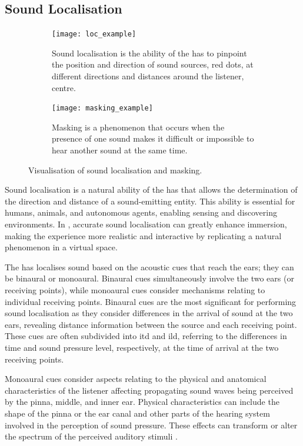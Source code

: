 \subsection{Sound Localisation}
\begin{figure}
    \centering
    \begin{subfigure}[t]{0.49\textwidth}
        \centering
        \texttt{[image: loc\_example]}
        \caption{Sound localisation is the ability of the \acrshort{has} to pinpoint the position and direction of sound sources, red dots, at different directions and distances around the listener, centre.}
        \label{fig:loc-example}
    \end{subfigure}
    \hfill
    \begin{subfigure}[t]{0.49\textwidth}
        \centering
        \texttt{[image: masking\_example]}
        \caption{Masking is a phenomenon that occurs when the presence of one sound makes it difficult or impossible to hear another sound at the same time.}
        \label{fig:masking-example}
    \end{subfigure}

       \caption[Visualisation of sound localisation and masking]{Visualisation of sound localisation and masking.}
       \label{fig:loc-masking-examples}
\end{figure}

Sound localisation is a natural ability of the \acrshort{has} that allows the determination of the direction and distance of a sound-emitting entity. This ability is essential for humans, animals, and autonomous agents, enabling sensing and discovering environments. In , accurate sound localisation can greatly enhance immersion, making the experience more realistic and interactive by replicating a natural phenomenon in a virtual space.\par
The \acrshort{has} localises sound based on the acoustic cues that reach the ears; they can be binaural or monoaural. Binaural cues simultaneously involve the two ears (or receiving points), while monoaural cues consider mechanisms relating to individual receiving points. Binaural cues are the most significant for performing sound localisation as they consider differences in the arrival of sound at the two ears, revealing distance information between the source and each receiving point. These cues are often subdivided into \acrfull{itd} and \acrfull{ild}, referring to the differences in time and sound pressure level, respectively, at the time of arrival at the two receiving points.\par
Monoaural cues consider aspects relating to the physical and anatomical characteristics of the listener affecting propagating sound waves being perceived by the pinna, middle, and inner ear. Physical characteristics can include the shape of the pinna or the ear canal and other parts of the hearing system involved in the perception of sound pressure. These effects can transform or alter the spectrum of the perceived auditory stimuli \citep{blauert1997spatial, howard2013acoustics}.


